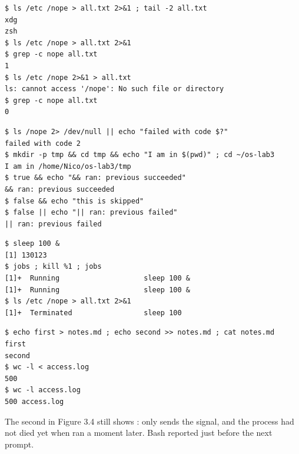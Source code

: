 \documentclass[11pt,a4paper]{article}
\begin{document}
\begin{lstlisting}[caption={Comparing the order of redirections}]
$ ls /etc /nope > all.txt 2>&1 ; tail -2 all.txt
xdg
zsh
$ ls /etc /nope > all.txt 2>&1
$ grep -c nope all.txt
1
$ ls /etc /nope 2>&1 > all.txt
ls: cannot access '/nope': No such file or directory
$ grep -c nope all.txt
0
\end{lstlisting}

\begin{lstlisting}[caption={The ; \&\& || operators}]
$ ls /nope 2> /dev/null || echo "failed with code $?"
failed with code 2
$ mkdir -p tmp && cd tmp && echo "I am in $(pwd)" ; cd ~/os-lab3
I am in /home/Nico/os-lab3/tmp
$ true && echo "&& ran: previous succeeded"
&& ran: previous succeeded
$ false && echo "this is skipped"
$ false || echo "|| ran: previous failed"
|| ran: previous failed
\end{lstlisting}

\begin{lstlisting}[caption={Running a background job and stopping it}]
$ sleep 100 &
[1] 130123
$ jobs ; kill %1 ; jobs
[1]+  Running                    sleep 100 &
[1]+  Running                    sleep 100 &
$ ls /etc /nope > all.txt 2>&1
[1]+  Terminated                 sleep 100
\end{lstlisting}

\begin{lstlisting}[caption={Appending and input redirection}]
$ echo first > notes.md ; echo second >> notes.md ; cat notes.md
first
second
$ wc -l < access.log
500
$ wc -l access.log
500 access.log
\end{lstlisting}

The second  in Figure 3.4 still shows :  only sends the
signal, and the process had not died yet when  ran a moment later. Bash reported
 just before the next prompt.
\end{document}
